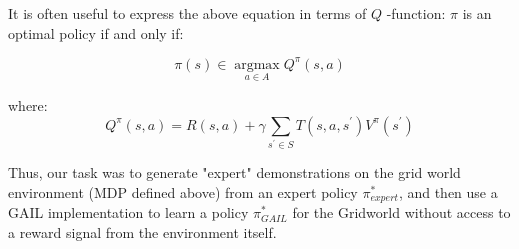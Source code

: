 It is often useful to express the above equation in terms of \(Q\) -function: \(\pi\) is an optimal policy if and
only if:

$$
\pi(s) \in \underset{a \in A}{\operatorname{argmax}} Q^{\pi}(s, a)
$$

where:
$$
Q^{\pi}(s, a)=R(s, a)+\gamma \sum_{s^{\prime} \in S} T\left(s, a, s^{\prime}\right) V^{\pi}\left(s^{\prime}\right)
$$

Thus, our task was to generate "expert" demonstrations on the grid world environment (MDP defined above) from an expert policy $\pi^*_{expert}$, and then use a GAIL implementation to learn a policy $\pi^*_{GAIL}$ for the Gridworld without access to a reward signal from the environment itself.